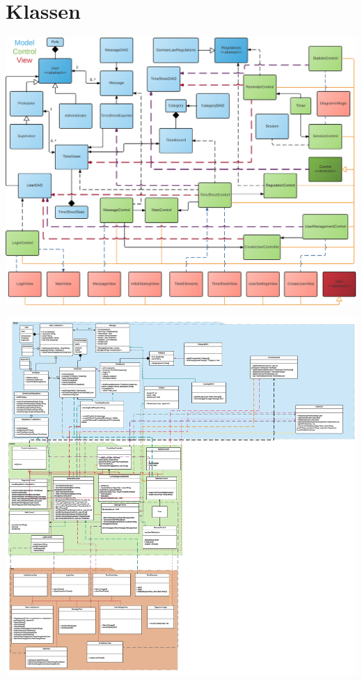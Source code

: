 \section{Klassen}
    \includegraphics[width=\linewidth]{Diagramms/class/associationdiagram.pdf}

    \includegraphics[width=\linewidth]{Diagramms/class/overview.pdf}
    \newpage

